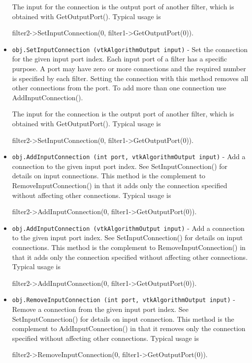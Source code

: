 \begin{itemize}
 The input for the connection is the output port of another
 filter, which is obtained with GetOutputPort().  Typical usage is

   filter2->SetInputConnection(0, filter1->GetOutputPort(0)).

\item  \verb|obj.SetInputConnection (vtkAlgorithmOutput input)| -  Set the connection for the given input port index.  Each input
 port of a filter has a specific purpose.  A port may have zero or
 more connections and the required number is specified by each
 filter.  Setting the connection with this method removes all
 other connections from the port.  To add more than one connection
 use AddInputConnection().

 The input for the connection is the output port of another
 filter, which is obtained with GetOutputPort().  Typical usage is

   filter2->SetInputConnection(0, filter1->GetOutputPort(0)).

\item  \verb|obj.AddInputConnection (int port, vtkAlgorithmOutput input)| -  Add a connection to the given input port index.  See
 SetInputConnection() for details on input connections.  This
 method is the complement to RemoveInputConnection() in that it
 adds only the connection specified without affecting other
 connections.  Typical usage is

   filter2->AddInputConnection(0, filter1->GetOutputPort(0)).

\item  \verb|obj.AddInputConnection (vtkAlgorithmOutput input)| -  Add a connection to the given input port index.  See
 SetInputConnection() for details on input connections.  This
 method is the complement to RemoveInputConnection() in that it
 adds only the connection specified without affecting other
 connections.  Typical usage is

   filter2->AddInputConnection(0, filter1->GetOutputPort(0)).

\item  \verb|obj.RemoveInputConnection (int port, vtkAlgorithmOutput input)| -  Remove a connection from the given input port index.  See
 SetInputConnection() for details on input connection.  This
 method is the complement to AddInputConnection() in that it
 removes only the connection specified without affecting other
 connections.  Typical usage is

   filter2->RemoveInputConnection(0, filter1->GetOutputPort(0)).


\end{itemize}

